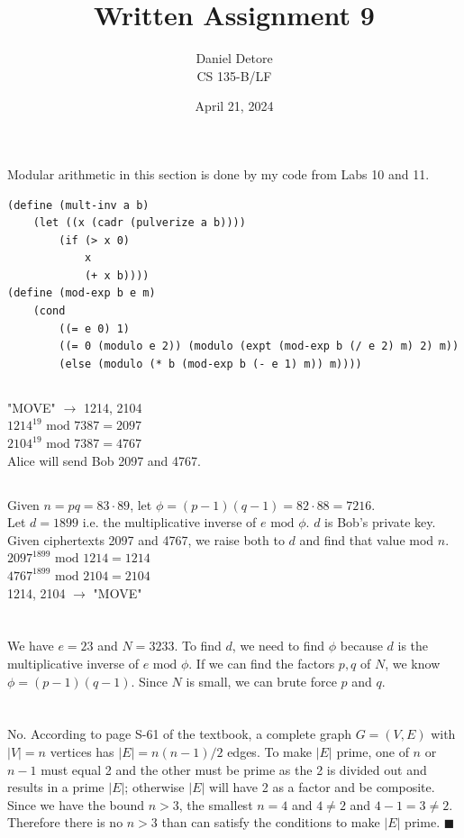 \documentclass{article}
\title{Written Assignment 9}
\author{Daniel Detore\\CS 135-B/LF}
\date{April 21, 2024}
\renewcommand{\mod}{\text{ mod }}
\begin{document}
\maketitle
\raggedright


\section{}
Modular arithmetic in this section is done by my code from Labs 10 and 11.\\
\begin{verbatim}
(define (mult-inv a b)
    (let ((x (cadr (pulverize a b))))
        (if (> x 0)
            x
            (+ x b))))
(define (mod-exp b e m)
    (cond
        ((= e 0) 1)
        ((= 0 (modulo e 2)) (modulo (expt (mod-exp b (/ e 2) m) 2) m))
        (else (modulo (* b (mod-exp b (- e 1) m)) m))))
\end{verbatim}
\subsection{}
"MOVE" $\rightarrow$ 1214, 2104\\
$1214^{19} \mod 7387 = 2097$\\
$2104^{19} \mod 7387 = 4767$\\
Alice will send Bob 2097 and 4767.

\subsection{}
Given $n = pq = 83\cdot89$, let $\phi = (p-1)(q-1) = 82\cdot88 = 7216$.\\
Let $d = 1899$ i.e. the multiplicative inverse of $e \mod \phi$. $d$ is Bob's private key. Given ciphertexts 2097 and 4767, we raise both to $d$ and find that value mod $n$.\\
$2097^{1899} \mod 1214 = 1214$\\
$4767^{1899} \mod 2104 = 2104$\\
1214, 2104 $\rightarrow$ "MOVE"


\section{}
We have $e= 23$ and $N = 3233$. To find $d$, we need to find $\phi$ because $d$ is the multiplicative inverse of $e \mod \phi$. If we can find the factors $p,q$ of $N$, we know $\phi = (p-1)(q-1)$. Since $N$ is small, we can brute force $p$ and $q$.


\section{}
No. According to page S-61 of the textbook, a complete graph $G = (V,E)$ with $|V| = n$ vertices has $|E| = n(n-1)/2$ edges. To make $|E|$ prime, one of $n$ or $n-1$ must equal 2 and the other must be prime as the 2 is divided out and results in a prime $|E|$; otherwise $|E|$ will have 2 as a factor and be composite. Since we have the bound $n>3$, the smallest $n = 4$ and $4 \neq 2$ and $4-1 = 3 \neq 2$. Therefore there is no $n>3$ than can satisfy the conditions to make $|E|$ prime. $\blacksquare$
\end{document}
